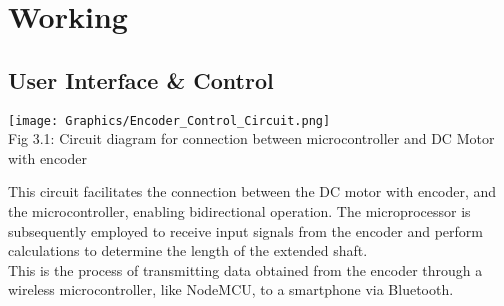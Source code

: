 \documentclass[a4,10pt]{report}
\begin{document}
\chapter{Working}
\section{User Interface \& Control}
\begin{center}
    \texttt{[image: Graphics/Encoder\_Control\_Circuit.png]} \\
    Fig 3.1: Circuit diagram for connection between microcontroller and DC Motor with encoder
\end{center}
This circuit facilitates the connection between the DC motor with encoder, and the microcontroller, enabling bidirectional operation. The microprocessor is subsequently employed to receive input signals from the encoder and perform calculations to determine the length of the extended shaft. \\
This is the process of transmitting data obtained from the encoder through a wireless microcontroller, like NodeMCU, to a smartphone via Bluetooth.
\end{document}
